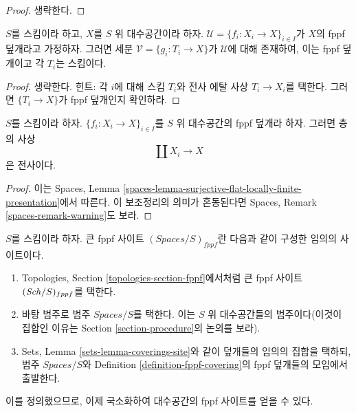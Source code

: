 \begin{proof}
생략한다.
\end{proof}

\begin{lemma}
\label{lemma-refine-fppf-schemes}
$S$를 스킴이라 하고, $X$를 $S$ 위 대수공간이라 하자.
$\mathcal{U} = \{f_i : X_i \to X\}_{i \in I}$가 $X$의 fppf 덮개라고
가정하자. 그러면 세분 $\mathcal{V} = \{g_i : T_i \to X\}$가
$\mathcal{U}$에 대해 존재하여, 이는 fppf 덮개이고 각
$T_i$는 스킴이다.
\end{lemma}

\begin{proof}
생략한다. 힌트: 각 $i$에 대해 스킴 $T_i$와 전사 에탈 사상
$T_i \to X_i$를 택한다. 그러면 $\{T_i \to X\}$가 fppf 덮개인지 확인하라.
\end{proof}

\begin{lemma}
\label{lemma-fppf-covering-surjective}
$S$를 스킴이라 하자. $\{f_i : X_i \to X\}_{i \in I}$를 $S$ 위
대수공간의 fppf 덮개라 하자. 그러면 층의 사상
$$
\coprod X_i \longrightarrow X
$$
은 전사이다.
\end{lemma}

\begin{proof}
이는 Spaces, Lemma
\ref{spaces-lemma-surjective-flat-locally-finite-presentation}에서 따른다.
이 보조정리의 의미가 혼동된다면 Spaces, Remark
\ref{spaces-remark-warning}도 보라.
\end{proof}

\begin{definition}
\label{definition-big-fppf-site}
$S$를 스킴이라 하자. 큰 fppf 사이트 {\it $(\textit{Spaces}/S)_{fppf}$}란
다음과 같이 구성한 임의의 사이트이다.
\begin{enumerate}
\item Topologies, Section \ref{topologies-section-fppf}에서처럼 큰 fppf
사이트 $(\mathit{Sch}/S)_{fppf}$를 택한다.
\item 바탕 범주로 범주 $\textit{Spaces}/S$를 택한다. 이는 $S$ 위
대수공간들의 범주이다(이것이 집합인 이유는 Section
\ref{section-procedure}의 논의를 보라).
\item Sets, Lemma \ref{sets-lemma-coverings-site}와 같이 덮개들의 임의의
집합을 택하되, 범주 $\textit{Spaces}/S$와 Definition
\ref{definition-fppf-covering}의 fppf 덮개들의 모임에서 출발한다.
\end{enumerate}
\end{definition}

\noindent
이를 정의했으므로, 이제 국소화하여 대수공간의 fppf 사이트를 얻을 수 있다.

